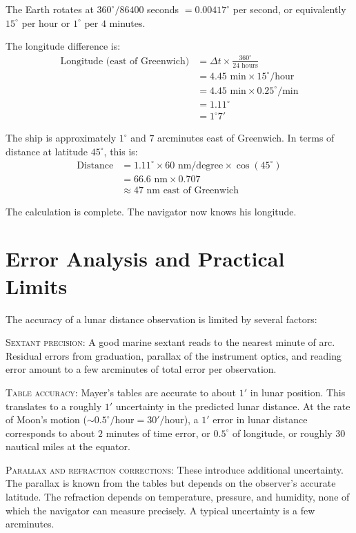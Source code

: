 The Earth rotates at $360^{\circ} / 86400$ seconds $= 0.00417^{\circ}$ per second, or equivalently $15^{\circ}$ per hour or $1^{\circ}$ per $4$ minutes.

The longitude difference is:
\begin{align}
\text{Longitude (east of Greenwich)} &= \Delta t \times \frac{360^{\circ}}{24 \text{ hours}} \\
&= 4.45 \text{ min} \times 15^{\circ}/\text{hour} \\
&= 4.45 \text{ min} \times 0.25^{\circ}/\text{min} \\
&= 1.11^{\circ} \\
&= 1^{\circ} 7'
\end{align}

The ship is approximately $1^{\circ}$ and $7$ arcminutes east of Greenwich. In terms of distance at latitude $45^{\circ}$, this is:
\begin{align}
\text{Distance} &= 1.11^{\circ} \times 60 \text{ nm/degree} \times \cos(45^{\circ}) \\
&= 66.6 \text{ nm} \times 0.707 \\
&\approx 47 \text{ nm east of Greenwich}
\end{align}

The calculation is complete. The navigator now knows his longitude.

\section{Error Analysis and Practical Limits}

The accuracy of a lunar distance observation is limited by several factors:

\textsc{Sextant precision:} A good marine sextant reads to the nearest minute of arc. Residual errors from graduation, parallax of the instrument optics, and reading error amount to a few arcminutes of total error per observation.

\textsc{Table accuracy:} Mayer's tables are accurate to about $1'$ in lunar position. This translates to a roughly $1'$ uncertainty in the predicted lunar distance. At the rate of Moon's motion ($\sim 0.5^{\circ}/\text{hour} = 30'/\text{hour}$), a $1'$ error in lunar distance corresponds to about $2$ minutes of time error, or $0.5^{\circ}$ of longitude, or roughly $30$ nautical miles at the equator.

\textsc{Parallax and refraction corrections:} These introduce additional uncertainty. The parallax is known from the tables but depends on the observer's accurate latitude. The refraction depends on temperature, pressure, and humidity, none of which the navigator can measure precisely. A typical uncertainty is a few arcminutes.


